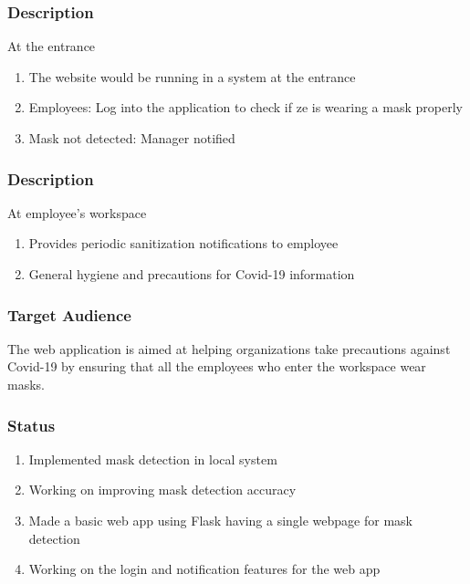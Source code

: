 \documentclass[14pt]{beamer}
\begin{document}
\begin{frame}
    \frametitle{Description}
    At the entrance
    \begin{enumerate}
        \item The website would be running in a system at the entrance

        \item Employees: Log into the application to check if ze is wearing a mask properly

        \item Mask not detected: Manager notified
    \end{enumerate}
\end{frame}

\begin{frame}
    \frametitle{Description}
    At employee's workspace
    \begin{enumerate}
        \item Provides periodic sanitization notifications to employee
            
        \item General hygiene and precautions for Covid-19 information
    \end{enumerate}
\end{frame}

\begin{frame}
    \frametitle{Target Audience}
    The web application is  aimed at helping organizations take precautions against Covid-19 by ensuring that all the employees who enter the workspace wear masks.
\end{frame}

\begin{frame}
    \frametitle{Status}
    \begin{enumerate}
        \item Implemented mask detection in local system
        \item Working on improving mask detection accuracy
        \item Made a basic web app using Flask having a single webpage for mask detection
        \item Working on the login and notification features for the web app
    \end{enumerate}
\end{frame}
\end{document}
